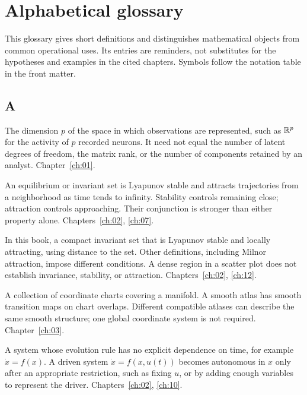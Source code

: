 \chapter{Alphabetical glossary}\label{app:e}
This glossary gives short definitions and distinguishes mathematical objects from common operational uses. Its entries are reminders, not substitutes for the hypotheses and examples in the cited chapters. Symbols follow the notation table in the front matter.

\section*{A}
\begin{description}[style=nextline]
\item[Ambient dimension.] The dimension $p$ of the space in which observations are represented, such as $\mathbb{R}^p$ for the activity of $p$ recorded neurons. It need not equal the number of latent degrees of freedom, the matrix rank, or the number of components retained by an analyst. Chapter~\ref{ch:01}.
\item[Asymptotic stability.] An equilibrium or invariant set is Lyapunov stable and attracts trajectories from a neighborhood as time tends to infinity. Stability controls remaining close; attraction controls approaching. Their conjunction is stronger than either property alone. Chapters~\ref{ch:02}, \ref{ch:07}.
\item[Attractor.] In this book, a compact invariant set that is Lyapunov stable and locally attracting, using distance to the set. Other definitions, including Milnor attraction, impose different conditions. A dense region in a scatter plot does not establish invariance, stability, or attraction. Chapters~\ref{ch:02}, \ref{ch:12}.
\item[Atlas.] A collection of coordinate charts covering a manifold. A smooth atlas has smooth transition maps on chart overlaps. Different compatible atlases can describe the same smooth structure; one global coordinate system is not required. Chapter~\ref{ch:03}.
\item[Autonomous system.] A system whose evolution rule has no explicit dependence on time, for example $\dot x=f(x)$. A driven system $\dot x=f(x,u(t))$ becomes autonomous in $x$ only after an appropriate restriction, such as fixing $u$, or by adding enough variables to represent the driver. Chapters~\ref{ch:02}, \ref{ch:10}.
\end{description}

